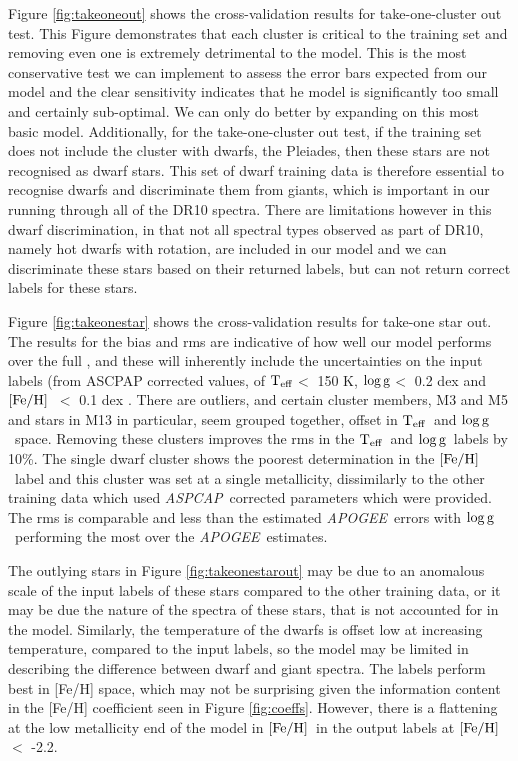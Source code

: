 \documentclass[12pt, preprint]{aastex}
\newcommand{\teff}{\mbox{$\rm T_{eff}$}}
\newcommand{\feh}{\mbox{$\rm [Fe/H]$}}
\newcommand{\logg}{\mbox{$\rm \log g$}}
\newcommand{\apogee}{\textsl{APOGEE}}
\newcommand{\aspcap}{\textsl{ASPCAP}}
\begin{document}
Figure \ref{fig:takeoneout} shows the cross-validation results for take-one-cluster out test. This Figure demonstrates that each cluster is critical to the training set and removing even one is extremely detrimental to the model. This is the most conservative test we can implement to assess the error bars expected from our model and the clear sensitivity indicates that he model is significantly too small and certainly sub-optimal. We can only do better by expanding on this most basic model. Additionally, for the take-one-cluster out test, if the training set does not include the cluster with dwarfs, the Pleiades, then these stars are not recognised as dwarf stars. This set of dwarf training data is therefore essential to recognise dwarfs and discriminate them from giants, which is important in our running through all of the DR10 spectra. There are limitations however in this dwarf discrimination, in that not all spectral types observed as part of DR10, namely hot dwarfs with rotation, are included in our model and we can discriminate these stars based on their returned labels, but can not return correct labels for these stars. 

Figure \ref{fig:takeonestar} shows the cross-validation results for take-one star out. The results for the bias and rms are indicative of how well our model performs over the full , and these will inherently include the uncertainties on the input labels (from ASCPAP corrected values, of \teff $<$ 150 K, \logg $<$ 0.2 dex and \feh\ $<$ 0.1 dex \citep{Meszaros2013}. There are outliers, and certain cluster members, M3 and M5 and stars in M13 in particular, seem grouped together, offset in \teff\ and \logg\ space. Removing these clusters improves the rms in the \teff\ and \logg\ labels by 10\%. The single dwarf cluster shows the poorest determination in the \feh\ label and this cluster was set at a single metallicity, dissimilarly to the other training data which used \aspcap\ corrected parameters which were provided. The rms is comparable and less than the estimated \apogee\ errors with \logg\ performing the most over the \apogee\ estimates.  

The outlying stars in Figure \ref{fig:takeonestarout} may be due to an anomalous scale of the input labels of these stars compared to the other training data, or it may be due the nature of the spectra of these stars, that is not accounted for in the model. Similarly, the temperature of the dwarfs is offset low at increasing temperature, compared to the input labels, so the model may be limited in describing the difference between dwarf and giant spectra. The labels perform best in [Fe/H] space, which may not be surprising given the information content in the [Fe/H] coefficient seen in Figure \ref{fig:coeffs}. However, there is a flattening at the low metallicity end of the model in \feh\ in the output labels at \feh\ $<$ -2.2. 
\end{document}
